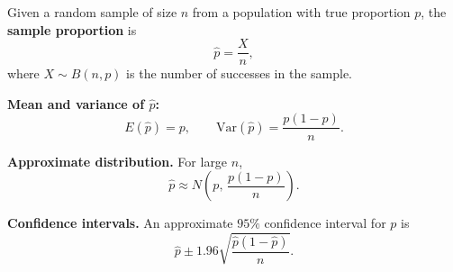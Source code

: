 
Given a random sample of size $n$ from a population with true proportion $p$, the \textbf{sample proportion} is
\[
\hat{p} = \frac{X}{n},
\]
where $X \sim B(n,p)$ is the number of successes in the sample.

\textbf{Mean and variance of $\hat{p}$:}
\[
E(\hat{p}) = p, \qquad \mathrm{Var}(\hat{p}) = \frac{p(1-p)}{n}.
\]

\textbf{Approximate distribution.} For large $n$,
\[
\hat{p} \approx N\!\left(p,\, \frac{p(1-p)}{n}\right).
\]

\textbf{Confidence intervals.} An approximate $95\%$ confidence interval for $p$ is
\[
\hat{p} \pm 1.96\sqrt{\frac{\hat{p}(1-\hat{p})}{n}}.
\]

